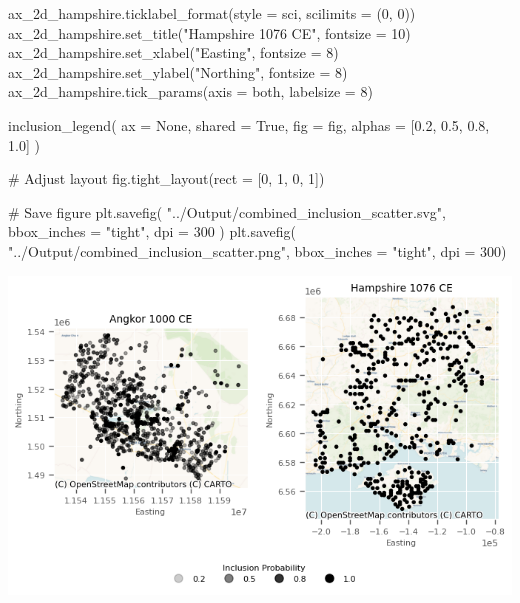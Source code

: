 \documentclass[
  11pt,
  letterpaper,
  DIV=11,
  numbers=noendperiod]{scrartcl}
\newenvironment{Shaded}{\begin{snugshade}}{\end{snugshade}}
\newcommand{\CommentTok}[1]{\textcolor[rgb]{0.37,0.37,0.37}{#1}}
\newcommand{\DecValTok}[1]{\textcolor[rgb]{0.68,0.00,0.00}{#1}}
\newcommand{\FloatTok}[1]{\textcolor[rgb]{0.68,0.00,0.00}{#1}}
\newcommand{\NormalTok}[1]{\textcolor[rgb]{0.00,0.23,0.31}{#1}}
\newcommand{\OperatorTok}[1]{\textcolor[rgb]{0.37,0.37,0.37}{#1}}
\newcommand{\StringTok}[1]{\textcolor[rgb]{0.13,0.47,0.30}{#1}}
\newcommand{\VariableTok}[1]{\textcolor[rgb]{0.07,0.07,0.07}{#1}}
\begin{document}
\begin{Shaded}
\begin{Highlighting}[]
\NormalTok{ax\_2d\_hampshire.ticklabel\_format(style }\OperatorTok{=} \StringTok{\textquotesingle{}sci\textquotesingle{}}\NormalTok{, scilimits }\OperatorTok{=}\NormalTok{ (}\DecValTok{0}\NormalTok{, }\DecValTok{0}\NormalTok{))}
\NormalTok{ax\_2d\_hampshire.set\_title(}\StringTok{"Hampshire 1076 CE"}\NormalTok{, fontsize }\OperatorTok{=} \DecValTok{10}\NormalTok{)}
\NormalTok{ax\_2d\_hampshire.set\_xlabel(}\StringTok{"Easting"}\NormalTok{, fontsize }\OperatorTok{=} \DecValTok{8}\NormalTok{)}
\NormalTok{ax\_2d\_hampshire.set\_ylabel(}\StringTok{"Northing"}\NormalTok{, fontsize }\OperatorTok{=} \DecValTok{8}\NormalTok{)}
\NormalTok{ax\_2d\_hampshire.tick\_params(axis }\OperatorTok{=} \StringTok{\textquotesingle{}both\textquotesingle{}}\NormalTok{, labelsize }\OperatorTok{=} \DecValTok{8}\NormalTok{)}

\NormalTok{inclusion\_legend(}
\NormalTok{    ax }\OperatorTok{=} \VariableTok{None}\NormalTok{, }
\NormalTok{    shared }\OperatorTok{=} \VariableTok{True}\NormalTok{, }
\NormalTok{    fig }\OperatorTok{=}\NormalTok{ fig, }
\NormalTok{    alphas }\OperatorTok{=}\NormalTok{ [}\FloatTok{0.2}\NormalTok{, }\FloatTok{0.5}\NormalTok{, }\FloatTok{0.8}\NormalTok{, }\FloatTok{1.0}\NormalTok{]}
\NormalTok{)}

\CommentTok{\# Adjust layout}
\NormalTok{fig.tight\_layout(rect }\OperatorTok{=}\NormalTok{ [}\DecValTok{0}\NormalTok{, }\DecValTok{1}\NormalTok{, }\DecValTok{0}\NormalTok{, }\DecValTok{1}\NormalTok{])}

\CommentTok{\# Save figure}
\NormalTok{plt.savefig(}
    \StringTok{"../Output/combined\_inclusion\_scatter.svg"}\NormalTok{, }
\NormalTok{    bbox\_inches }\OperatorTok{=} \StringTok{"tight"}\NormalTok{, }
\NormalTok{    dpi }\OperatorTok{=} \DecValTok{300}
\NormalTok{)}
\NormalTok{plt.savefig(}
    \StringTok{"../Output/combined\_inclusion\_scatter.png"}\NormalTok{, }
\NormalTok{    bbox\_inches }\OperatorTok{=} \StringTok{"tight"}\NormalTok{, }
\NormalTok{    dpi }\OperatorTok{=} \DecValTok{300}\NormalTok{)}
\end{Highlighting}
\end{Shaded}

\includegraphics{analysis_files/figure-pdf/cell-23-output-1.png}
\end{document}
